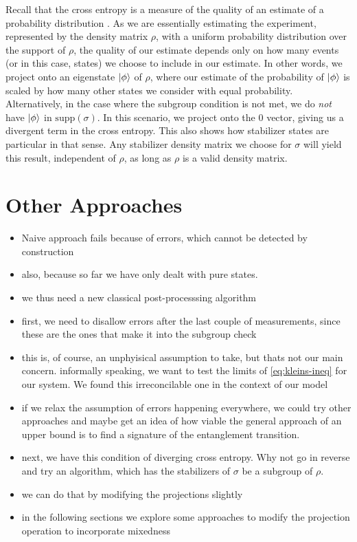 Recall that the cross entropy is a measure of the quality of an estimate of a
probability distribution \cite{coverElementsInformationTheory2006}. As we are
essentially estimating the experiment, represented by the density matrix
$\rho$, with a uniform probability distribution over the support of $\rho$, the
quality of our estimate depends only on how many events (or in this case,
states) we choose to include in our estimate. In other words, we project onto
an eigenstate $\ket{\phi}$ of $\rho$, where our estimate of the probability of
$\ket{\phi}$ is scaled by how many other states we consider with equal
probability. Alternatively, in the case where the subgroup condition is not
met, we do \emph{not} have $\ket{\phi}$ in $\mathrm{supp}\left( \sigma
\right)$. In this scenario, we project onto the $0$ vector, giving us a
divergent term in the cross entropy.
This also shows how stabilizer
states are particular in that sense. Any stabilizer density matrix we choose
for $\sigma$ will yield this result, independent of $\rho$, as long as $\rho$
is a valid density matrix. 
\section{Other Approaches}\label{sec:other-approaches}
\begin{itemize}
  \item Naive approach fails because of errors, which cannot be detected by
    construction
  \item also, because so far we have only dealt with pure states.
  \item we thus need a new classical post-processsing algorithm
  \item first, we need to disallow errors after the last couple of
    measurements, since these are the ones that make it into the subgroup check
  \item this is, of course, an unphyisical assumption to take, but thats not
    our main concern. informally speaking, we want to test the limits of
    \cref{eq:kleins-ineq} for our system. We found this irreconcilable one in
    the context of our model
  \item if we relax the assumption of errors happening everywhere, we could try
    other approaches and maybe get an idea of how viable the general approach
    of an upper bound is to find a signature of the entanglement transition.
  \item next, we have this condition of diverging cross entropy. Why not go in
    reverse and try an algorithm, which has the stabilizers of $\sigma$ be a
    subgroup of $\rho$.
  \item we can do that by modifying the projections slightly
  \item in the following sections we explore some approaches to modify the
    projection operation to incorporate mixedness
\end{itemize}
